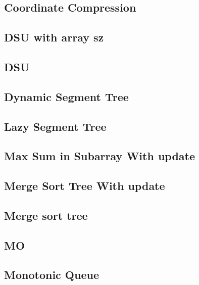 ﻿\documentclass[10pt,twocolumn]{article}
\newcommand{\codefile}[1]{}}
\begin{document}
\subsection{Coordinate Compression}
\codefile{Data Structure/Coordinate Compression.cpp}

\subsection{DSU with array sz}
\codefile{Data Structure/DSU with array sz.cpp}

\subsection{DSU}
\codefile{Data Structure/DSU.cpp}

\subsection{Dynamic Segment Tree}
\codefile{Data Structure/Dynamic Segment Tree.cpp}

\subsection{Lazy Segment Tree}
\codefile{Data Structure/Lazy Segment Tree.cpp}

\subsection{Max Sum in Subarray With update}
\codefile{Data Structure/Max Sum in Subarray With update.cpp}

\subsection{Merge Sort Tree With update}
\codefile{Data Structure/Merge Sort Tree With update.cpp}

\subsection{Merge sort tree}
\codefile{Data Structure/Merge sort tree.cpp}

\subsection{MO}
\codefile{Data Structure/MO.cpp}

\subsection{Monotonic Queue}
\codefile{Data Structure/Monotonic Queue.cpp}
\end{document}
